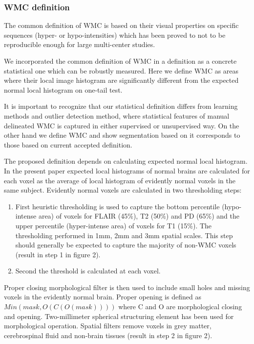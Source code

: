 \subsubsection{WMC definition}
The common definition of WMC is based on their visual properties on specific sequences (hyper- or hypo-intensities) which has been proved to not to be reproducible enough for large multi-center studies. 
\par
We incorporated the common definition of WMC in a definition as a concrete statistical one which can be robustly measured. Here we  define WMC as areas where their local image histogram are significantly different from the expected normal local histogram on one-tail test.
\par
It is important to recognize that our statistical definition differs from learning methods and outlier detection method, where statistical features of manual delineated WMC is captured in either supervised or unsupervised way.
On the other hand we define WMC and show segmentation based on it corresponds to those based on current accepted definition.
\par
The proposed definition depends on calculating expected normal local histogram. In the present paper expected local histograms of normal brains are calculated for each voxel as the average of local histogram of evidently normal voxels in the same subject. Evidently normal voxels are calculated in two thresholding steps:
\begin{enumerate}
\item First heuristic thresholding is used to capture the bottom percentile (hypo-intense area) of voxels for FLAIR (45\%), T2 (50\%) and PD (65\%) and the upper percentile (hyper-intense area) of voxels for T1 (15\%). The thresholding performed in 1mm, 2mm and 3mm spatial scales. This step should generally be expected to capture the majority of non-WMC voxels (result in step 1 in figure 2).
\item Second the threshold is calculated  \cite{ReduceSVM} at each voxel.
\end{enumerate}

Proper closing morphological filter is then used to include small holes and missing voxels in the evidently normal brain. Proper opening is defined as $ Min(mask,O( C( O( mask )))  ) $ where C and O are morphological closing and opening. Two-millimeter spherical structuring element has been used for morphological operation. Spatial filters remove voxels in grey matter, cerebrospinal fluid and non-brain tissues (result in step 2 in figure 2).

    
    
    
    
    
    
    
    
    
  
  
  